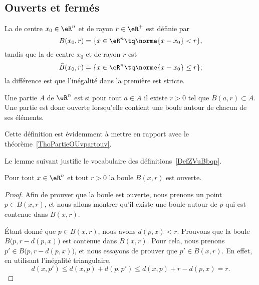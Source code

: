 \subsection{Ouverts et fermés}

\begin{definition}  \label{DefZVuBbqp}
	La  de centre $x_0 \in \eR^n$ et de rayon $r \in
	\eR^+$ est définie par
	\begin{equation}
		B(x_0,r) = \{ x \in \eR^n \tq \norme{x - x_0} < r \},
	\end{equation}
	tandis que la  de centre $x_0$ et de rayon $r$ est
	\begin{equation}
		\bar B(x_0,r) = \{ x \in \eR^n \tq \norme{x - x_0} \leq r \};
	\end{equation}
	la différence est que l'inégalité dans la première est stricte.
\end{definition}

\begin{definition}  \label{DefUOyCQtW}
    Une partie \( A\) de \( \eR^n\) est  si pour tout \( a\in A\) il existe \( r>0\) tel que \( B(a,r)\subset A\). Une partie est donc ouverte lorsqu'elle contient une boule autour de chacun de ses éléments.
\end{definition}
Cette définition est évidemment à mettre en rapport avec le théorème~\ref{ThoPartieOUvpartouv}.

Le lemme suivant justifie le vocabulaire des définitions~\ref{DefZVuBbqp}.
\begin{lemma}   \label{LemMESSExh}
    Pour tout $x \in \eR^n$ et tout $r >0$ la boule \( B(x,r)\) est ouverte.
\end{lemma}

\begin{proof}
    Afin de prouver que la boule est ouverte, nous prenons un point $p\in B(x,r)$, et nous allons montrer qu'il existe une boule autour de $p$ qui est contenue dans $B(x,r)$.

    Étant donné que $p\in B(x,r)$, nous avons $d(p,x)<r$. Prouvons que la boule $B\big(p,r-d(p,x)\big)$ est contenue dans $B(x,r)$. Pour cela, nous prenons $p'\in B\big(p,r-d(p,x)\big)$, et nous essayons de prouver que $p'\in B(x,r)$. En effet, en utilisant l'inégalité triangulaire,
    \begin{equation}
	    d(x,p')\leq d(x,p)+d(p,p')\leq d(x,p)+r-d(p,x)=r.
    \end{equation}
\end{proof}

